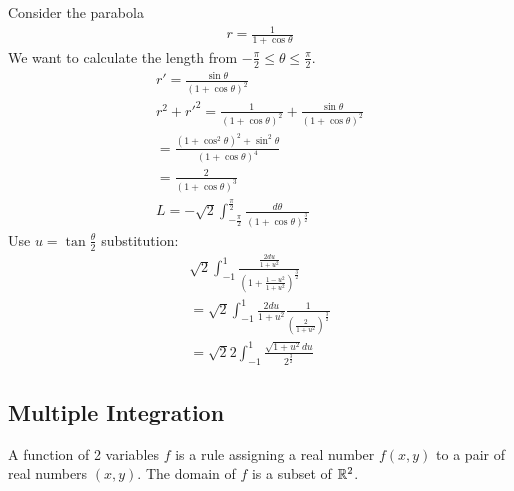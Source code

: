 \begin{ex}
	Consider the parabola
	\begin{align*}
	r = \frac 1 {1+\cos \theta}
	\end{align*}
	We want to calculate the length from $-\frac \pi 2 \le \theta \le \frac \pi 2$.
	\begin{align*}
		r' = \frac{\sin \theta}{(1+\cos \theta)^2} \\
		r^2 + r'^2 = \frac 1 {(1+\cos \theta)^2} + \frac{\sin \theta}{(1+\cos \theta)^2} \\
		= \frac{(1+\cos^2 \theta)^2 + \sin^2 \theta}{(1+ \cos \theta)^4} \\
		= \frac 2 {(1+\cos \theta)^3} \\
		L = -\sqrt 2 \int_{-\frac \pi 2}^{\frac \pi 2} \frac {d \theta}{(1+\cos \theta)^{\frac 3 2}}
	\end{align*}
		Use $u = \tan \frac \theta 2$ substitution:
	\begin{align*}
		\sqrt 2 \int_{-1}^{1} \frac{\frac{2du}{1+u^2}}{\left(1+\frac{1-u^2}{1+u^2} \right)^{\frac 3 2}} \\
		= \sqrt 2 \int_{-1}^{1} \frac{2 du}{1+u^2} \frac 1 {\left( \frac 2 {1+u^2} \right)^{\frac 3 2}} \\
		= \sqrt 2 2 \int_{-1}^{1} \frac{\sqrt{1+u^2} du}{2^{\frac 3 2}}
	\end{align*}
\end{ex}


\subsection{Multiple Integration}


A function of 2 variables  $f$ is a rule assigning a real number $f(x,y)$ to a pair of real numbers $(x,y)$. The domain of $f$ is a subset of $\mathbb R^2$. 

